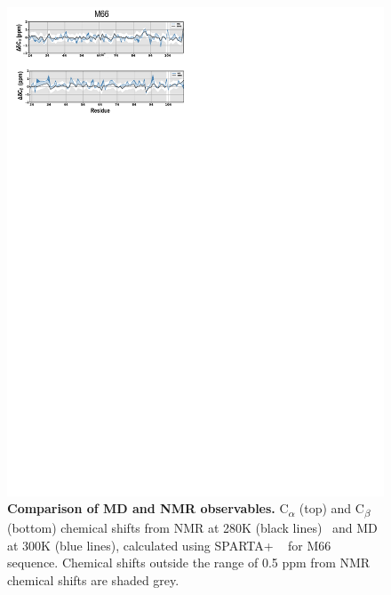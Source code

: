 \documentclass[journal=jacsat,manuscript=article]{achemso}
\begin{document}
 \begin{figure}[!ht]
\includegraphics[scale=0.5,width=\textwidth,trim={0 0cm 0 0cm},clip]{../figures/S2.pdf}
\caption{{\bf Comparison of MD and NMR observables.} C\textsubscript{$\alpha$} (top) and C\textsubscript{$\beta$} (bottom) chemical shifts from NMR at 280K (black lines)~\cite{Anastasia2013} and MD at 300K (blue lines), calculated using SPARTA+ ~\cite{Shen2010} for M66 sequence. Chemical shifts outside the range of 0.5 ppm from NMR chemical shifts are shaded grey.}
\label{S2} 
\end{figure}
\end{document}
